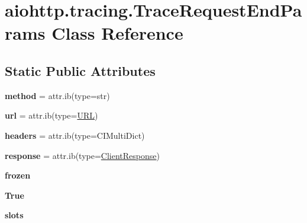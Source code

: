 \hypertarget{classaiohttp_1_1tracing_1_1_trace_request_end_params}{}\section{aiohttp.\+tracing.\+Trace\+Request\+End\+Params Class Reference}
\label{classaiohttp_1_1tracing_1_1_trace_request_end_params}
\subsection*{Static Public Attributes}
\begin{DoxyCompactItemize}
\item 
\mbox{\label{classaiohttp_1_1tracing_1_1_trace_request_end_params_a73feb1cab2cacb8aa4a0170707eb37d7}} 
{\bfseries method} = attr.\+ib(type=str)
\item 
\mbox{\label{classaiohttp_1_1tracing_1_1_trace_request_end_params_a61a32504f542aed9abe72ba1340ebd0c}} 
{\bfseries url} = attr.\+ib(type=\hyperlink{classyarl_1_1_u_r_l}{U\+RL})
\item 
\mbox{\label{classaiohttp_1_1tracing_1_1_trace_request_end_params_ace205a294469fff2ac104230ba295488}} 
{\bfseries headers} = attr.\+ib(type=C\+I\+Multi\+Dict)
\item 
\mbox{\label{classaiohttp_1_1tracing_1_1_trace_request_end_params_a78486637b7f572b33957e05876cc36f7}} 
{\bfseries response} = attr.\+ib(type=\hyperlink{classaiohttp_1_1client__reqrep_1_1_client_response}{Client\+Response})
\item 
\mbox{\label{classaiohttp_1_1tracing_1_1_trace_request_end_params_a6bad71898bb2e808addd537e1a677fd0}} 
{\bfseries frozen}
\item 
\mbox{\label{classaiohttp_1_1tracing_1_1_trace_request_end_params_a993fe1963c2c3ac9e85e76107921e0ee}} 
{\bfseries True}
\item 
\mbox{\label{classaiohttp_1_1tracing_1_1_trace_request_end_params_a3f1467e639e898c1dbea4840e74235b8}} 
{\bfseries slots}
\end{DoxyCompactItemize}


